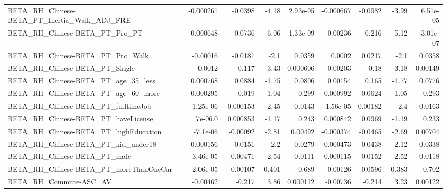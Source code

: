 \begin{tabular}{lrrrrrrrr}
BETA\_RH\_Chinese-BETA\_PT\_Inertia\_Walk\_ADJ\_FRE       &   -0.000261 &      -0.0398 &    -4.18 & 2.93e-05 &  -0.000667 &     -0.0982 &        -3.99 &      6.51e-05 \\
BETA\_RH\_Chinese-BETA\_PT\_Pro\_PT                     &   -0.000648 &      -0.0736 &    -6.06 & 1.33e-09 &   -0.00236 &      -0.216 &        -5.12 &      3.01e-07 \\
BETA\_RH\_Chinese-BETA\_PT\_Pro\_Walk                   &    -0.00016 &      -0.0181 &     -2.1 &   0.0359 &     0.0002 &      0.0217 &         -2.1 &        0.0358 \\
BETA\_RH\_Chinese-BETA\_PT\_Single                     &     -0.0012 &       -0.117 &    -3.43 & 0.000606 &   -0.00203 &       -0.18 &        -3.18 &       0.00149 \\
BETA\_RH\_Chinese-BETA\_PT\_age\_35\_less                &    0.000768 &       0.0884 &    -1.75 &   0.0806 &    0.00154 &       0.165 &        -1.77 &        0.0776 \\
BETA\_RH\_Chinese-BETA\_PT\_age\_60\_more                &    0.000295 &        0.019 &    -1.04 &    0.299 &   0.000992 &      0.0624 &        -1.05 &         0.293 \\
BETA\_RH\_Chinese-BETA\_PT\_fulltimeJob                &   -1.25e-06 &    -0.000153 &    -2.45 &   0.0143 &   1.56e-05 &     0.00182 &         -2.4 &        0.0163 \\
BETA\_RH\_Chinese-BETA\_PT\_haveLicense                &     7e-06.0 &     0.000853 &    -1.17 &    0.243 &   0.000842 &      0.0969 &        -1.19 &         0.233 \\
BETA\_RH\_Chinese-BETA\_PT\_highEducation              &    -7.1e-06 &     -0.00092 &    -2.81 &  0.00492 &  -0.000374 &     -0.0465 &        -2.69 &       0.00704 \\
BETA\_RH\_Chinese-BETA\_PT\_kid\_under18                &   -0.000156 &      -0.0151 &     -2.2 &   0.0279 &  -0.000473 &     -0.0438 &        -2.12 &        0.0338 \\
BETA\_RH\_Chinese-BETA\_PT\_male                       &   -3.46e-05 &     -0.00471 &    -2.54 &   0.0111 &   0.000115 &      0.0152 &        -2.52 &        0.0118 \\
BETA\_RH\_Chinese-BETA\_PT\_moreThanOneCar             &    2.06e-05 &      0.00107 &   -0.401 &    0.689 &    0.00126 &      0.0596 &       -0.383 &         0.702 \\
BETA\_RH\_Commute-ASC\_AV                             &    -0.00462 &       -0.217 &     3.86 & 0.000112 &   -0.00736 &      -0.214 &         3.23 &       0.00122 \\

\end{tabular}
